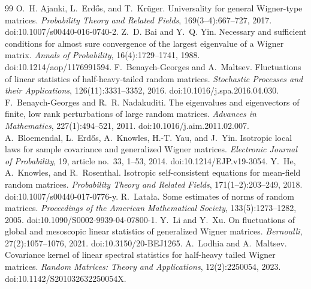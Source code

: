 \documentclass[10pt,a4paper]{amsart}
\begin{document}
\begin{thebibliography}{99}
 O.~H. Ajanki, L.~Erd\H{o}s, and T.~Kr\"uger. \newblock Universality for general Wigner-type matrices. \newblock \emph{Probability Theory and Related Fields}, 169(3--4):667--727, 2017. \newblock doi:10.1007/s00440-016-0740-2.
 Z.~D. Bai and Y.~Q. Yin. \newblock Necessary and sufficient conditions for almost sure convergence of the largest eigenvalue of a Wigner matrix. \newblock \emph{Annals of Probability}, 16(4):1729--1741, 1988. \newblock doi:10.1214/aop/1176991594.
 F.~Benaych-Georges and A.~Maltsev. \newblock Fluctuations of linear statistics of half-heavy-tailed random matrices. \newblock \emph{Stochastic Processes and their Applications}, 126(11):3331--3352, 2016. \newblock doi:10.1016/j.spa.2016.04.030.
 F.~Benaych-Georges and R.~R. Nadakuditi. \newblock The eigenvalues and eigenvectors of finite, low rank perturbations of large random matrices. \newblock \emph{Advances in Mathematics}, 227(1):494--521, 2011. \newblock doi:10.1016/j.aim.2011.02.007.
 A.~Bloemendal, L.~Erd\H{o}s, A.~Knowles, H.-T. Yau, and J.~Yin. \newblock Isotropic local laws for sample covariance and generalized Wigner matrices. \newblock \emph{Electronic Journal of Probability}, 19, article no.~33, 1--53, 2014. \newblock doi:10.1214/EJP.v19-3054.
 Y.~He, A.~Knowles, and R.~Rosenthal. \newblock Isotropic self-consistent equations for mean-field random matrices. \newblock \emph{Probability Theory and Related Fields}, 171(1--2):203--249, 2018. \newblock doi:10.1007/s00440-017-0776-y.
 R.~Lata\l a. \newblock Some estimates of norms of random matrices. \newblock \emph{Proceedings of the American Mathematical Society}, 133(5):1273--1282, 2005. \newblock doi:10.1090/S0002-9939-04-07800-1.
 Y.~Li and Y.~Xu. \newblock On fluctuations of global and mesoscopic linear statistics of generalized Wigner matrices. \newblock \emph{Bernoulli}, 27(2):1057--1076, 2021. \newblock doi:10.3150/20-BEJ1265.
 A.~Lodhia and A.~Maltsev. \newblock Covariance kernel of linear spectral statistics for half-heavy tailed Wigner matrices. \newblock \emph{Random Matrices: Theory and Applications}, 12(2):2250054, 2023. \newblock doi:10.1142/S201032632250054X.

\end{thebibliography}
\end{document}
